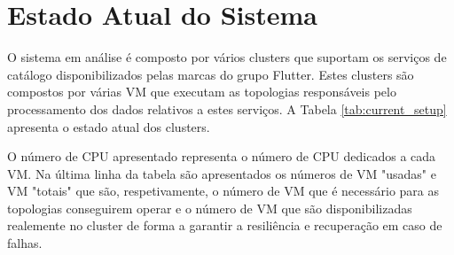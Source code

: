 \section{Estado Atual do Sistema}

O sistema em análise é composto por vários \glspl{cluster} que suportam os serviços de catálogo
disponibilizados pelas marcas do grupo Flutter. Estes \glspl{cluster} são compostos por várias
\ac{VM} que executam as topologias responsáveis pelo processamento dos dados relativos a estes
serviços. A Tabela \ref{tab:current_setup} apresenta o estado atual dos \glspl{cluster}.

O número de \ac{CPU} apresentado representa o número de \ac{CPU} dedicados a cada \ac{VM}. Na
última linha da tabela são apresentados os números de \ac{VM} "usadas" e \ac{VM} "totais" que são,
respetivamente, o número de \ac{VM} que é necessário para as topologias conseguirem operar e 
o número de \ac{VM} que são disponibilizadas realemente no \gls{cluster} de forma a garantir a 
resiliência e recuperação em caso de falhas.

